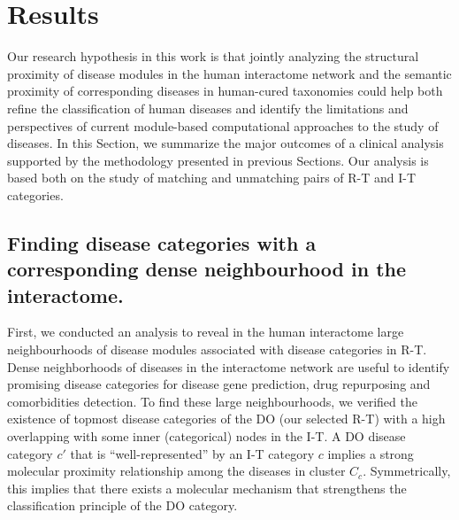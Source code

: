 \documentclass[journal,twoside,web]{ieeecolor}
\begin{document}
\vspace{-20pt}
\section{Results}
\label{results}

Our research hypothesis in this work is that jointly analyzing the structural proximity of disease modules in the human interactome network and the semantic proximity of corresponding diseases in human-cured taxonomies could help both refine the classification of human diseases and
identify the limitations and perspectives of current module-based computational approaches to the study of diseases. In this Section, we summarize the major outcomes of a clinical analysis supported by the methodology presented in previous Sections. Our analysis is based both on the study of matching and unmatching pairs of R-T and I-T categories.


\vspace{-10pt}
\noindent
\subsection{Finding disease categories with a corresponding dense neighbourhood in the interactome. }
\label{dense neighbourhood}
First, we  conducted an analysis to reveal in the human interactome large neighbourhoods of disease modules associated with disease categories in R-T. Dense neighborhoods of diseases in the interactome network are useful to identify promising disease categories for disease gene prediction, drug repurposing and comorbidities detection.
To find these large neighbourhoods, we verified the existence of  topmost disease categories of the DO (our selected R-T) with a high overlapping with some inner (categorical) nodes in the  I-T. A  DO disease category $c'$ that is  ``well-represented'' by  an I-T category $c$ implies 
 a strong molecular proximity relationship among the  diseases in cluster $C_c$. Symmetrically, this implies  that there exists  a molecular mechanism that strengthens the classification principle of the DO category. 
\end{document}
